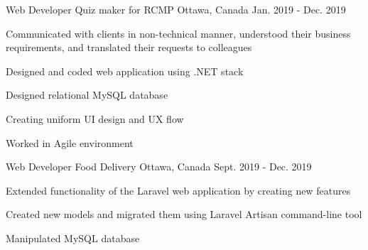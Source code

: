 
\begin{cventries}

  \cventry
    {Web  Developer} %
    {Quiz maker for RCMP} %
    {Ottawa, Canada} %
    {Jan. 2019 - Dec. 2019} %
    {
      \begin{cvitems} %
        \item {Communicated with clients in non-technical manner, understood their business requirements, and translated their requests to colleagues}
        \item {Designed and coded web application using .NET stack}
        \item {Designed relational MySQL database}
        \item {Creating uniform UI design and UX flow}
        \item {Worked in Agile environment}
      \end{cvitems}
    }


  \cventry
    {Web Developer} %
    {Food Delivery} %
    {Ottawa, Canada} %
    {Sept. 2019 - Dec. 2019} %
    {
      \begin{cvitems} %
      \item Extended functionality of the Laravel web application by creating new features
      \item Created new models and migrated them using Laravel Artisan command-line tool
      \item Manipulated MySQL database
      \end{cvitems}
    }


\end{cventries}
